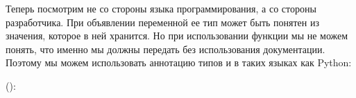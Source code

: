 \documentclass[letterpaper,10pt,russian]{sphinxmanual}
\begin{document}
\begin{sphinxVerbatim}[commandchars=\\\{\}]

\end{sphinxVerbatim}

\sphinxAtStartPar
Теперь посмотрим не со стороны языка программирования, а со стороны разработчика. При объявлении переменной ее тип может быть понятен из значения, которое в ней хранится. Но при использовании функции мы не можем понять, что именно мы должны передать без использования документации. Поэтому мы можем использовать аннотацию типов и в таких языках как Python:

\sphinxAtStartPar
():

\begin{sphinxVerbatim}[commandchars=\\\{\}]
 
        
       
         
            

    \PYG{p}{[}\PYG{p}{]}
        
       
         
            

\end{sphinxVerbatim}
\end{document}
